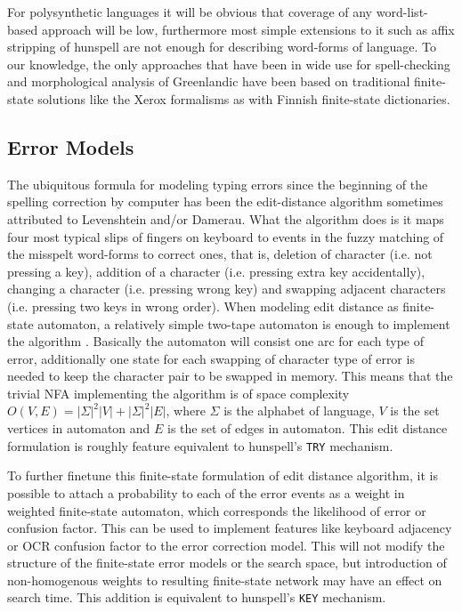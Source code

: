 \documentclass[11pt]{article}
\begin{document}
For polysynthetic languages it will be obvious that coverage of any
word-list-based approach will be low, furthermore most simple extensions to it
such as affix stripping of hunspell are not enough for describing word-forms of
language. To our knowledge, the only approaches that have been in wide use for
spell-checking and morphological analysis of Greenlandic have been based on
traditional finite-state solutions like the Xerox formalisms as with Finnish
finite-state dictionaries.

\subsection{Error Models}
\label{subsec:error-models}

The ubiquitous formula for modeling typing errors since the beginning of the
spelling correction by computer has been the edit-distance algorithm
sometimes attributed to 
Levenshtein\cite{levenshtein/1966} and/or Damerau\cite{damerau/1964}. What the
algorithm does is it maps four most typical slips of fingers on keyboard to
events in the fuzzy matching of the misspelt word-forms to correct ones, that
is, deletion of character (i.e. not pressing a key), addition of a character
(i.e. pressing extra key accidentally), changing a character (i.e. pressing
wrong key) and swapping adjacent characters (i.e. pressing two keys in wrong
order). When modeling edit distance as finite-state automaton, a relatively
simple two-tape automaton is enough to implement the algorithm 
\cite{hassan/2008}. 
Basically the automaton will consist one arc for each type of error, 
additionally one state for each swapping of character type of error is needed to
keep the character pair to be swapped in memory. This means that the trivial
NFA implementing the algorithm is of space complexity $O(V, E) = 
|\Sigma|^2 |V| + |\Sigma|^2 |E|$, where $\Sigma$ is the alphabet of language,
$V$ is the set vertices in automaton and $E$ is the set of edges in automaton.
This edit distance formulation is roughly feature equivalent to hunspell's
\texttt{TRY} mechanism.

To further finetune this finite-state formulation of edit distance algorithm, it
is possible to attach a probability to each of the error events as a weight in
weighted finite-state automaton, which corresponds the likelihood of error or
confusion factor. This can be used to implement features like keyboard adjacency
or OCR confusion factor to the error correction model. This will not modify
the structure of the finite-state error models or the search space, but 
introduction of non-homogenous weights to resulting finite-state network
may have an effect on search time. This addition is equivalent to hunspell's
\texttt{KEY} mechanism.
\end{document}

